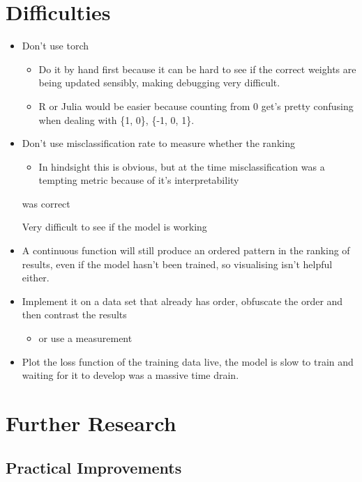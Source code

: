 \documentclass[a4paper,11pt,twoside]{article}
\begin{document}
\section{Difficulties}
\label{sec:org42052f3}
\begin{itemize}
\item Don't use torch
\begin{itemize}
\item Do it by hand first because it can be hard to see if the correct
weights are being updated sensibly, making debugging very difficult.
\item R or Julia would be easier because counting from 0 get's pretty
confusing when dealing with \{1, 0\}, \{-1, 0, 1\}.
\end{itemize}
\item Don't use misclassification rate to measure whether the ranking
\begin{itemize}
\item In hindsight this is obvious, but at the time misclassification
was a tempting metric because of it's interpretability
\end{itemize}
was correct

Very difficult to see if the model is working

\item A continuous function will still produce an ordered pattern in
the ranking of results, even if the model hasn't been trained,
so visualising isn't helpful either.

\item Implement it on a data set that already has order, obfuscate the
order and then contrast the results
\begin{itemize}
\item or use a measurement
\end{itemize}

\item Plot the loss function of the training data live, the model is
slow to train and waiting for it to develop was a massive time
drain.
\end{itemize}



\section{Further Research}
\label{sec:orgd51f572}


\subsection{Practical Improvements}
\label{sec:orgaa6d9a4}
\end{document}
